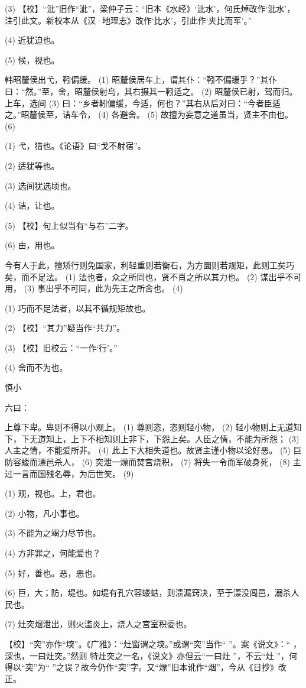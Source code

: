 \documentclass[12pt,UTF8]{ctexbook}
\begin{document}
(3) 【校】“沘”旧作“泚”，梁仲子云：“旧本《水经》‘泚水’，何氏焯改作‘沘水’，注引此文。新校本从《汉·地理志》改作‘比水’，引此作‘夹比而军’。”

(4) 近犹迫也。

(5) 候，视也。

韩昭釐侯出弋，靷偏缓。 (1) 昭釐侯居车上，谓其仆：“靷不偏缓乎？”其仆曰：“然。”至，舍，昭釐侯射鸟，其右摄其一靷适之。 (2) 昭釐侯已射，驾而归。上车，选间 (3) 曰：“乡者靷偏缓，今适，何也？”其右从后对曰：“今者臣适之。”昭釐侯至，诘车令， (4) 各避舍。 (5) 故擅为妄意之道虽当，贤主不由也。 (6)

(1) 弋，猎也。《论语》曰“戈不射宿”。

(2) 适犹等也。

(3) 选间犹选顷也。

(4) 诘，让也。

(5) 【校】句上似当有“与右”二字。

(6) 由，用也。

今有人于此，擅矫行则免国家，利轻重则若衡石，为方圜则若规矩，此则工矣巧矣，而不足法。 (1) 法也者，众之所同也，贤不肖之所以其力也。 (2) 谋出乎不可用， (3) 事出乎不可同，此为先王之所舍也。 (4)

(1) 巧而不足法者，以其不循规矩故也。

(2) 【校】“其力”疑当作“共力”。

(3) 【校】旧校云：“一作‘行’。”

(4) 舍而不为也。





慎小


六曰：

上尊下卑。卑则不得以小观上。 (1) 尊则恣，恣则轻小物， (2) 轻小物则上无道知下，下无道知上，上下不相知则上非下，下怨上矣。人臣之情，不能为所怨； (3) 人主之情，不能爱所非。 (4) 此上下大相失道也。故贤主谨小物以论好恶。 (5) 巨防容蝼而漂邑杀人， (6) 突泄一熛而焚宫烧积， (7) 将失一令而军破身死， (8) 主过一言而国残名辱，为后世笑。 (9)

(1) 观，视也。上，君也。

(2) 小物，凡小事也。

(3) 不能为之竭力尽节也。

(4) 方非罪之，何能爱也？

(5) 好，善也。恶，恶也。

(6) 巨，大；防，堤也。如堤有孔穴容蝼蛄，则溃漏窍决，至于漂没闾邑，溺杀人民也。

(7) 灶突烟泄出，则火滥炎上，烧人之宫室积委也。

【校】“突”亦作“堗”。《广雅》：“灶窗谓之堗。”或谓“突”当作“ ”。案《说文》：“ ，深也，一曰灶突。”然则 特灶突之一名，《说文》亦但云“一曰灶 ”，不云“灶 ”，何得以“突”为“ ”之误？故今仍作“突”字。又“熛”旧本讹作“烟”，今从《日抄》改正。
\end{document}
